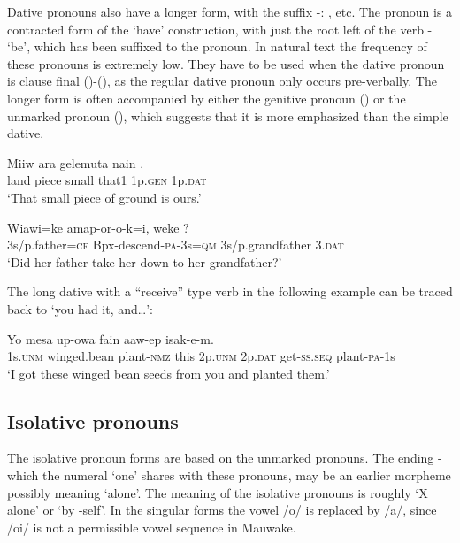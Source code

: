 Dative pronouns also have a longer form, with the suffix -: ,  etc. The pronoun is a contracted form of the `have' construction, with just the root left of the verb - `be', which has been suffixed to the pronoun. In natural text the frequency of these pronouns is extremely low. They have to be used when the dative pronoun is clause final ()-(), as the regular dative pronoun only occurs pre-verbally. The longer form is often accompanied by either the genitive pronoun () or the unmarked pronoun (), which suggests that it is more emphasized than the simple dative.

\ea%
\label{ex:x597}
\gll Miiw ara gelemuta nain  . \\
land piece small that1 1p.\textsc{gen} 1p.\textsc{dat}\\
\glt`That small piece of ground is ours.'
\z

\ea%
\label{ex:x598}
\gll Wiawi=ke amap-or-o-k=i, weke ? \\
3s/p.father=\textsc{cf} Bpx-descend-\textsc{pa}-3s=\textsc{qm} 3s/p.grandfather 3.\textsc{dat}\\
\glt`Did her father take her down to her grandfather?'
\z

The long dative with a ``receive'' type verb in the following example can be traced back to  `you had it, and{\dots}':

\ea%
\label{ex:x596}
\gll Yo mesa up-owa fain   aaw-ep isak-e-m.\\
1s.\textsc{unm} winged.bean plant-\textsc{nmz} this 2p.\textsc{unm} 2p.\textsc{dat} get-\textsc{ss}.\textsc{seq} plant-\textsc{pa}-1s\\
\glt`I got these winged bean seeds from you and planted them.'
\z

\subsection{Isolative pronouns}
{}
The isolative pronoun forms are based on the unmarked pronouns. The ending \nobreakdash-\textstyleStyleVernacularWordsItalic{,} which the numeral  `one' shares with these pronouns, may be an earlier morpheme possibly meaning `alone'. The meaning of the isolative pronouns is roughly `X alone' or `by -self'. In the singular forms the vowel /o/ is replaced by /a/, since /oi/ is not a permissible vowel sequence in Mauwake. 


